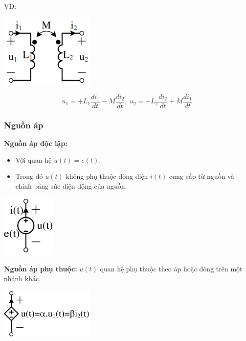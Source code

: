 VD:
\begin{center}
  \includegraphics[width=0.35\textwidth]{./image/8.png}
\end{center}
\[
  u_1 = +L_1\dfrac{di_1}{dt}- M\dfrac{di_2}{dt},\ u_2 = - L_2\dfrac{di_2}{dt}+ M\dfrac{di_1}{dt}
\]
\subsubsection{Nguồn áp}
\textbf{Nguồn áp độc lập:}
\begin{itemize}
  \item Với quan hệ $u(t) = e(t)$. 
  \item Trong đó $u(t)$ không phụ thuộc dòng điện $i(t)$ cung cấp từ nguồn và chính bằng sức điện động của nguồn.
\end{itemize}
\begin{center}
  \includegraphics[width=0.2\textwidth]{./image/9.png}
\end{center}
\textbf{Nguồn áp phụ thuộc:} $u(t)$ quan hệ phụ thuộc theo áp hoặc dòng trên một nhánh khác.
\begin{center}
  \includegraphics[width=0.35\textwidth]{./image/10.png}
\end{center}

